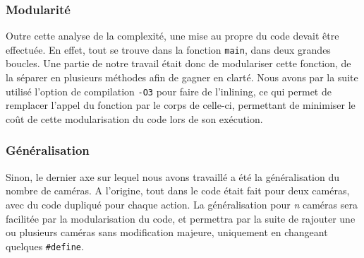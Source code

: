\subsubsection{Modularité}

Outre cette analyse de la complexité, une mise au propre du code devait être effectuée. En effet, tout se trouve dans la fonction \texttt{main}, dans deux grandes boucles. Une partie de notre travail était donc de modulariser cette fonction, de la séparer en plusieurs méthodes afin de gagner en clarté. Nous avons par la suite utilisé l'option de compilation \texttt{-O3} pour faire de l'inlining, ce qui permet de remplacer l'appel du fonction par le corps de celle-ci, permettant de minimiser le coût de cette modularisation du code lors de son exécution.

\subsubsection{Généralisation}

Sinon, le dernier axe sur lequel nous avons travaillé a été la généralisation du nombre de caméras. A l'origine, tout dans le code était fait pour deux caméras, avec du code dupliqué pour chaque action. La généralisation pour \textit{n} caméras sera facilitée par la modularisation du code, et permettra par la suite de rajouter une ou plusieurs caméras sans modification majeure, uniquement en changeant quelques \texttt{\#define}.

